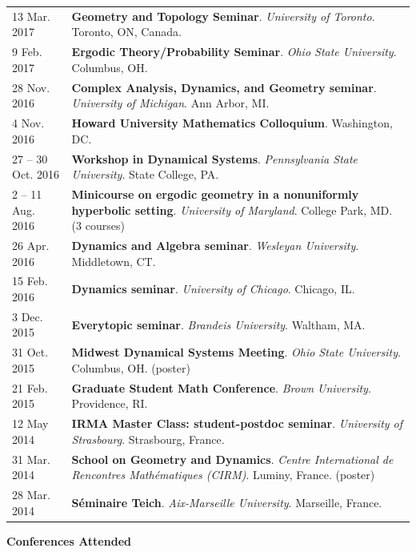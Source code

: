 \begin{center}
{\begin{longtable}{p{}  p{}}
13 Mar.  2017 & \textbf{Geometry and Topology Seminar}. \textit{University of Toronto}.  Toronto, ON, Canada.  \\ 
9 Feb.  2017 & \textbf{Ergodic Theory/Probability Seminar}. \textit{Ohio State University}.  Columbus, OH.  \\ 
28 Nov.  2016 & \textbf{Complex Analysis, Dynamics, and Geometry seminar}. \textit{University of Michigan}.  Ann Arbor, MI.  \\ 
4 Nov.  2016 & \textbf{Howard University Mathematics Colloquium}.  Washington, DC.  \\ 
27  -- 30 Oct.  2016 & \textbf{Workshop in Dynamical Systems}. \textit{Pennsylvania State University}.  State College, PA.  \\ 
2  -- 11 Aug.  2016 & \textbf{Minicourse on ergodic geometry in a nonuniformly hyperbolic setting}. \textit{University of Maryland}.  College Park, MD. (3 courses) \\ 
26 Apr.  2016 & \textbf{Dynamics and Algebra seminar}. \textit{Wesleyan University}.  Middletown, CT.  \\ 
15 Feb.  2016 & \textbf{Dynamics seminar}. \textit{University of Chicago}.  Chicago, IL.  \\ 
3 Dec.  2015 & \textbf{Everytopic seminar}. \textit{Brandeis University}.  Waltham, MA.  \\ 
31 Oct.  2015 & \textbf{Midwest Dynamical Systems Meeting}. \textit{Ohio State University}.  Columbus, OH. (poster) \\ 
21 Feb.  2015 & \textbf{Graduate Student Math Conference}. \textit{Brown University}.  Providence, RI.  \\ 
12 May  2014 & \textbf{IRMA Master Class: student-postdoc seminar}. \textit{University of Strasbourg}.  Strasbourg, France.  \\ 
31 Mar.  2014 & \textbf{School on Geometry and Dynamics}. \textit{Centre International de Rencontres Math\'ematiques (CIRM)}.  Luminy, France. (poster) \\ 
28 Mar.  2014 & \textbf{S\'eminaire Teich}. \textit{Aix-Marseille University}.  Marseille, France.  
    \end{longtable}
    } 
    \end{center}

    \vspace{-1em}
    

    \textbf{\large Conferences Attended}
    
